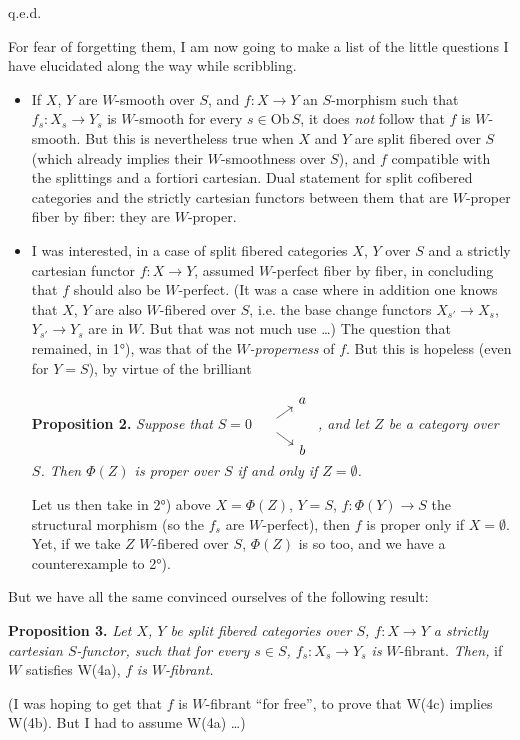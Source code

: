\documentclass[11pt]{article}
\newcommand{\printedpage}[1]{\marginpar{\footnotesize p.~#1}}
\newcommand{\msp}[1]{\marginpar{\footnotesize [#1]}}
\begin{document}
\hfill q.e.d.

For fear of forgetting them, I am now going to make a list of the little questions I have elucidated along the way while scribbling.

\begin{itemize}[leftmargin=5em,labelsep=0.5em]
\item[1°)] If $X$, $Y$ are $W$-smooth over $S$, and $f : X \longrightarrow Y$ an $S$-morphism such that $f_s : X_s \longrightarrow Y_s$ is $W$-smooth for every $s \in \mathrm{Ob}\,S$, it does \textit{not} follow that $f$ is $W$-smooth. But this is nevertheless true when $X$ and $Y$ are split fibered over $S$ (which
\printedpage{42}
\msp{page 57}
already implies their $W$-smoothness over $S$), and $f$ compatible with the splittings and a fortiori cartesian. Dual statement for split cofibered categories and the strictly cartesian functors between them that are $W$-proper fiber by fiber: they are $W$-proper.

\item[2°)] I was interested, in a case of split fibered categories $X$, $Y$ over $S$ and a strictly cartesian functor $f : X \longrightarrow Y$, assumed $W$-perfect fiber by fiber, in concluding that $f$ should also be $W$-perfect. (It was a case where in addition one knows that $X$, $Y$ are also $W$-fibered over $S$, i.e. the base change functors $X_{s'} \longrightarrow X_s$, $Y_{s'} \longrightarrow Y_s$ are in $W$. But that was not much use \dots) The question that remained, in 1°), was that of the $W$\textit{-properness} of $f$. But this is hopeless (even for $Y = S$), by virtue of the brilliant %

\textbf{Proposition 2.} \textit{Suppose that} $S = 0$
$\begin{tikzcd}[ampersand replacement=\&, row sep=tiny, column sep=small, baseline=(Z.base)]
\& a \\
|[alias=Z]| \phantom{0} \arrow[ur] \arrow[dr] \& \\
\& b
\end{tikzcd}$
\textit{, and let $Z$ be a category over $S$. Then $\Phi(Z)$ is proper over $S$ if and only if $Z = \emptyset$.}

Let us then take in 2°) above $X = \Phi(Z)$, $Y = S$, $f : \Phi(Y) \longrightarrow S$ the structural morphism (so the $f_s$ are $W$-perfect), then $f$ is proper only if $X = \emptyset$. Yet, if we take $Z$ $W$-fibered over $S$, $\Phi(Z)$ is so too, and we have a counterexample to 2°).
\end{itemize}

But we have all the same convinced ourselves of the following result:

\textbf{Proposition 3.} \textit{Let $X$, $Y$ be split fibered categories over $S$, $f : X \longrightarrow Y$ a strictly cartesian $S$-functor, such that}
\msp{page 58}
\textit{for every $s \in S$, $f_s : X_s \longrightarrow Y_s$ is} $W$-fibrant. \textit{Then,} if $W$ satisfies W(4a), $f$ \textit{is $W$-fibrant.}

(I was hoping to get that $f$ is $W$-fibrant ``for free'', to prove that W(4c) implies W(4b). But I had to assume W(4a) \dots)
\end{document}
